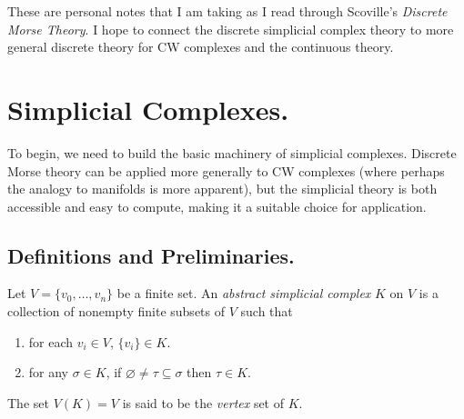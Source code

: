 
\usepackage{csquotes}
\usepackage[style=verbose-ibid,backend=bibtex]{biblatex}


\usepackage{scalerel,stmaryrd}
\newsavebox\wedgearrowbaseline
\savebox{}
\newcommand{\wedgearrow}{\mathrel{\scalerel*{%
    \usebox{\wedgearrowbaseline}}{X}}} %

\rhead{\today}



These are personal notes that I am taking as I read through Scoville's \textit{Discrete Morse Theory}\autocite{dmt}.
I hope to connect the discrete simplicial complex theory to more general discrete theory for CW complexes and the
continuous theory.

\section{Simplicial Complexes.}

To begin, we need to build the basic machinery of simplicial complexes. Discrete Morse theory can be applied more generally to CW complexes
(where perhaps the analogy to manifolds is more apparent), but the simplicial theory is both accessible and easy to compute, making it a
suitable choice for application.

\subsection{Definitions and Preliminaries.}

\begin{definition}
    Let $V = \{v_0, \dots, v_n\}$ be a finite set. An \emph{abstract simplicial complex} $K$ on $V$ is a collection of nonempty
    finite subsets of $V$ such that
    \begin{enumerate}
        \item for each $v_i \in V$, $\{v_i\} \in K$.
        \item for any $\sigma \in K$, if $\varnothing \neq \tau \subseteq \sigma$ then $\tau \in K$.
    \end{enumerate}
    The set $V(K) = V$ is said to be the \emph{vertex} set of $K$.
\end{definition}

